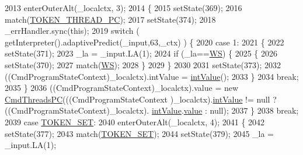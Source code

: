 \begin{DoxyCode}
2013         enterOuterAlt(\_localctx, 3);
2014         \{
2015         setState(369);
2016         match(\hyperlink{classgov_1_1nasa_1_1jpf_1_1inspector_1_1client_1_1parser_1_1_console_grammar_parser_aaff98354be1a1583da6fc9387508ca64}{TOKEN\_THREAD\_PC});
2017         setState(374);
2018         \_errHandler.sync(\textcolor{keyword}{this});
2019         \textcolor{keywordflow}{switch} ( getInterpreter().adaptivePredict(\_input,63,\_ctx) ) \{
2020         \textcolor{keywordflow}{case} 1:
2021           \{
2022           setState(371);
2023           \_la = \_input.LA(1);
2024           \textcolor{keywordflow}{if} (\_la==\hyperlink{classgov_1_1nasa_1_1jpf_1_1inspector_1_1client_1_1parser_1_1_console_grammar_parser_a6914a3a3adbc350b12a7df9d1b24abf1}{WS}) \{
2025             \{
2026             setState(370);
2027             match(\hyperlink{classgov_1_1nasa_1_1jpf_1_1inspector_1_1client_1_1parser_1_1_console_grammar_parser_a6914a3a3adbc350b12a7df9d1b24abf1}{WS});
2028             \}
2029           \}
2030 
2031           setState(373);
2032           ((CmdProgramStateContext)\_localctx).intValue = \hyperlink{classgov_1_1nasa_1_1jpf_1_1inspector_1_1client_1_1parser_1_1_console_grammar_parser_a132b5d5236398d90d8d1e6b16dc0bd20}{intValue}();
2033           \}
2034           \textcolor{keywordflow}{break};
2035         \}
2036          ((CmdProgramStateContext)\_localctx).value =  \textcolor{keyword}{new} \hyperlink{classgov_1_1nasa_1_1jpf_1_1inspector_1_1client_1_1commands_1_1_cmd_threads_p_c}{CmdThreadsPC}(((CmdProgramStateContext
      )\_localctx).\hyperlink{classgov_1_1nasa_1_1jpf_1_1inspector_1_1client_1_1parser_1_1_console_grammar_parser_a132b5d5236398d90d8d1e6b16dc0bd20}{intValue} != null ? ((CmdProgramStateContext)\_localctx).
      \hyperlink{classgov_1_1nasa_1_1jpf_1_1inspector_1_1client_1_1parser_1_1_console_grammar_parser_a132b5d5236398d90d8d1e6b16dc0bd20}{intValue}.\hyperlink{classgov_1_1nasa_1_1jpf_1_1inspector_1_1client_1_1parser_1_1_console_grammar_parser_1_1_int_value_context_a47964dd9f967981f0b77c57b35833709}{value} : null); 
2037         \}
2038         \textcolor{keywordflow}{break};
2039       \textcolor{keywordflow}{case} \hyperlink{classgov_1_1nasa_1_1jpf_1_1inspector_1_1client_1_1parser_1_1_console_grammar_parser_a39ec12074b4253f46d036e799fdafdb2}{TOKEN\_SET}:
2040         enterOuterAlt(\_localctx, 4);
2041         \{
2042         setState(377);
2043         match(\hyperlink{classgov_1_1nasa_1_1jpf_1_1inspector_1_1client_1_1parser_1_1_console_grammar_parser_a39ec12074b4253f46d036e799fdafdb2}{TOKEN\_SET});
2044         setState(379);
2045         \_la = \_input.LA(1);

\end{DoxyCode}
